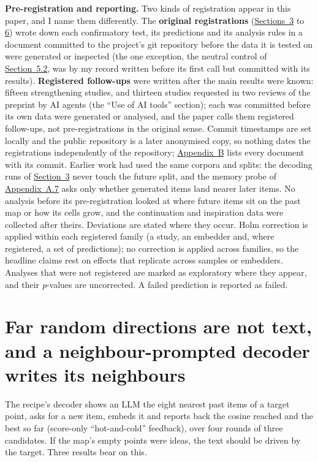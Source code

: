 \documentclass[
  10pt,
]{article}
\begin{document}
\textbf{Pre-registration and reporting.}
Two kinds of registration appear in this
paper, and I name them differently. The
\textbf{original registrations}
(\hyperref[sec:3]{Sections~3} to
\hyperref[sec:6]{6}) wrote down each
confirmatory test, its predictions and
its analysis rules in a document
committed to the project's git
repository before the data it is tested
on were generated or inspected (the one
exception, the neutral control of
\hyperref[sec:5.2]{Section~5.2}, was by
my record written before its first call
but committed with its results).
\textbf{Registered follow-ups} were
written after the main results were
known: fifteen strengthening studies,
and thirteen studies requested in two
reviews of the preprint by AI agents
(the ``Use of AI tools'' section); each
was committed before its own data were
generated or analysed, and the paper
calls them registered follow-ups, not
pre-registrations in the original sense.
Commit timestamps are set locally and
the public repository is a later
anonymised copy, so nothing dates the
registrations independently of the
repository; \hyperref[app:B]{Appendix~B}
lists every document with its commit.
Earlier work had used the same corpora
and splits: the decoding runs of
\hyperref[sec:3]{Section~3} never touch
the future split, and the memory probe
of \hyperref[app:A.7]{Appendix~A.7} asks
only whether generated items land nearer
later items. No analysis before its
pre-registration looked at where future
items sit on the past map or how its
cells grow, and the continuation and
inspiration data were collected after
theirs. Deviations are stated where they
occur. Holm correction is applied within
each registered family (a study, an
embedder and, where registered, a set of
predictions); no correction is applied
across families, so the headline claims
rest on effects that replicate across
samples or embedders. Analyses that were
not registered are marked as exploratory
where they appear, and their
\emph{p}-values are uncorrected. A
failed prediction is reported as failed.

\section{Far random directions are not text, and a neighbour-prompted decoder writes its neighbours}\label{sec:3}

The recipe's decoder shows an LLM the
eight nearest past items of a target
point, asks for a new item, embeds it
and reports back the cosine reached and
the best so far (score-only
``hot-and-cold'' feedback), over four
rounds of three candidates. If the map's
empty points were ideas, the text should
be driven by the target. Three results
bear on this.
\end{document}
